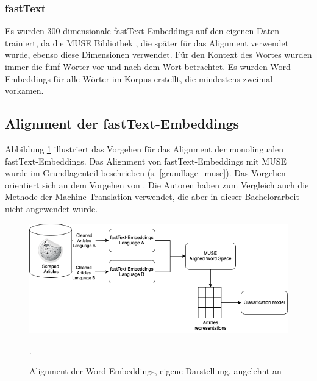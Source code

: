 \documentclass[ngerman]{ttlab-qualify}
\begin{document}
\subsubsection{fastText}
Es wurden 300-dimensionale fastText-Embeddings auf den eigenen Daten trainiert, da die MUSE Bibliothek \parencite{conneau2017word}, die später für das Alignment verwendet wurde, ebenso diese Dimensionen verwendet. Für den Kontext des Wortes wurden immer die fünf Wörter vor und nach dem Wort betrachtet. Es wurden Word Embeddings für alle Wörter im Korpus erstellt, die mindestens zweimal vorkamen.
\subsection{Alignment der fastText-Embeddings}
Abbildung \ref{aligned_articles} illustriert das Vorgehen für das Alignment der monolingualen fastText-Embeddings. Das Alignment von fastText-Embeddings mit MUSE wurde im Grundlagenteil beschrieben (s. \ref{grundlage_muse}). Das Vorgehen orientiert sich an dem Vorgehen von \textcite{jiang2019cross}. Die Autoren haben zum Vergleich auch die Methode der Machine Translation verwendet, die aber in dieser Bachelorarbeit nicht angewendet wurde. 
\begin{figure}[H]
\begin{center}
\includegraphics[width=14cm]{grafiken/MUSE_aligned_embeddings.drawio.png}
\caption[Alignment der Word Embeddings]{Alignment der Word Embeddings, eigene Darstellung, angelehnt an \textcite[2]{jiang2019cross}}.
\label{aligned_articles}
\end{center}
\end{figure}
\end{document}
